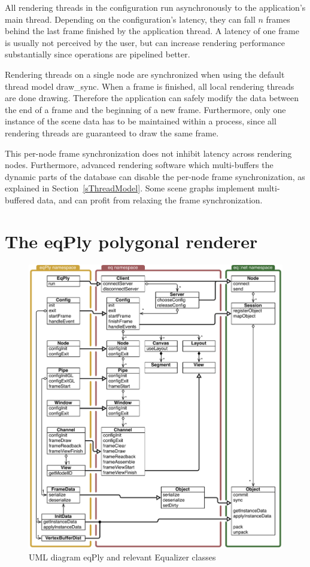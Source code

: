 \documentclass[10pt,a4]{scrartcl}
\newcommand{\sref}[1]{Section~\ref{#1}}
\begin{document}
All rendering threads in the configuration run asynchronously to the
application's main thread. Depending on the configuration's latency,
they can fall $n$ frames behind the last frame finished by the
application thread. A latency of one frame is usually not perceived by
the user, but can increase rendering performance substantially since
operations are pipelined better.

Rendering threads on a single node are synchronized when using the
default thread model \textsf{draw\_sync}. When a frame is finished, all
local rendering threads are done drawing. Therefore the application can
safely modify the data between the end of a frame and the beginning of a
new frame. Furthermore, only one instance of the scene data has to be
maintained within a process, since all rendering threads are guaranteed
to draw the same frame.

This per-node frame synchronization does not inhibit latency across
rendering nodes. Furthermore, advanced rendering software which
multi-buffers the dynamic parts of the database can disable the per-node
frame synchronization, as explained in \sref{sThreadModel}. Some scene
graphs implement multi-buffered data, and can profit from relaxing the
frame synchronization.



\section{\label{sEqPly}The eqPly polygonal renderer}

\begin{figure}[ht!]\center
  \includegraphics[width=.9\textwidth]{images/uml}
  {\caption{\label{fUml}UML diagram eqPly and relevant Equalizer classes}}
\end{figure}
\end{document}
